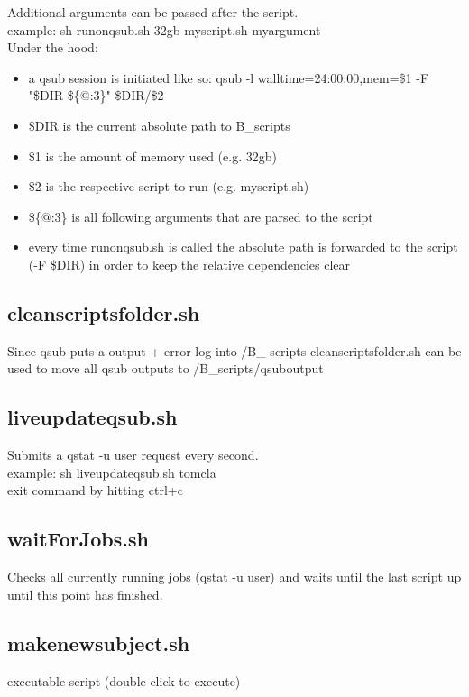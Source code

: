 \documentclass[12pt,a4paper]{scrartcl}
\begin{document}
\noindent Additional arguments can be passed after the script.\\

example: sh runonqsub.sh 32gb myscript.sh myargument\\

\noindent Under the hood:
\begin{itemize}
\item a qsub session is initiated like so: qsub -l walltime=24:00:00,mem=\$1 -F "\$DIR \$\{@:3\}" \$DIR/\$2
\item \$DIR is the current absolute path to B\_scripts
\item \$1 is the amount of memory used (e.g. 32gb)
\item \$2 is the respective script to run (e.g. myscript.sh)
\item \$\{@:3\} is all following arguments that are parsed to the script
\item every time runonqsub.sh is called the absolute path is forwarded to the script (-F \$DIR) in order to keep the relative dependencies clear
\end{itemize}

\subsection{cleanscriptsfolder.sh}
Since qsub puts a output + error log into /B\_ scripts cleanscriptsfolder.sh can be used to move all qsub outputs to /B\_scripts/qsuboutput\\

\subsection{liveupdateqsub.sh}
Submits a qstat -u user request every second.\\

example: sh liveupdateqsub.sh tomcla\\

\noindent exit command by hitting ctrl+c

\subsection{waitForJobs.sh}
Checks all currently running jobs (qstat -u user) and waits until the last script up until this point has finished.

\subsection{makenewsubject.sh}
executable script (double click to execute)\\
\end{document}
